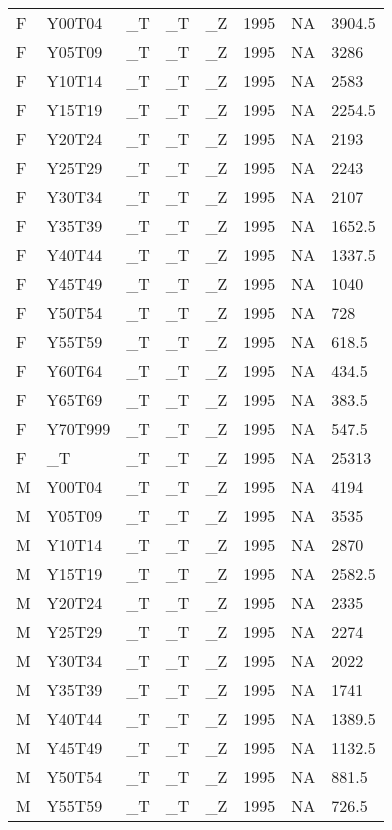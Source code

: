 \begin{longtable}[t]{llllllll}
F & Y00T04 & \_T & \_T & \_Z & 1995 & NA & 3904.5\\
F & Y05T09 & \_T & \_T & \_Z & 1995 & NA & 3286\\
\addlinespace
F & Y10T14 & \_T & \_T & \_Z & 1995 & NA & 2583\\
F & Y15T19 & \_T & \_T & \_Z & 1995 & NA & 2254.5\\
F & Y20T24 & \_T & \_T & \_Z & 1995 & NA & 2193\\
F & Y25T29 & \_T & \_T & \_Z & 1995 & NA & 2243\\
F & Y30T34 & \_T & \_T & \_Z & 1995 & NA & 2107\\
\addlinespace
F & Y35T39 & \_T & \_T & \_Z & 1995 & NA & 1652.5\\
F & Y40T44 & \_T & \_T & \_Z & 1995 & NA & 1337.5\\
F & Y45T49 & \_T & \_T & \_Z & 1995 & NA & 1040\\
F & Y50T54 & \_T & \_T & \_Z & 1995 & NA & 728\\
F & Y55T59 & \_T & \_T & \_Z & 1995 & NA & 618.5\\
\addlinespace
F & Y60T64 & \_T & \_T & \_Z & 1995 & NA & 434.5\\
F & Y65T69 & \_T & \_T & \_Z & 1995 & NA & 383.5\\
F & Y70T999 & \_T & \_T & \_Z & 1995 & NA & 547.5\\
F & \_T & \_T & \_T & \_Z & 1995 & NA & 25313\\
M & Y00T04 & \_T & \_T & \_Z & 1995 & NA & 4194\\
\addlinespace
M & Y05T09 & \_T & \_T & \_Z & 1995 & NA & 3535\\
M & Y10T14 & \_T & \_T & \_Z & 1995 & NA & 2870\\
M & Y15T19 & \_T & \_T & \_Z & 1995 & NA & 2582.5\\
M & Y20T24 & \_T & \_T & \_Z & 1995 & NA & 2335\\
M & Y25T29 & \_T & \_T & \_Z & 1995 & NA & 2274\\
\addlinespace
M & Y30T34 & \_T & \_T & \_Z & 1995 & NA & 2022\\
M & Y35T39 & \_T & \_T & \_Z & 1995 & NA & 1741\\
M & Y40T44 & \_T & \_T & \_Z & 1995 & NA & 1389.5\\
M & Y45T49 & \_T & \_T & \_Z & 1995 & NA & 1132.5\\
M & Y50T54 & \_T & \_T & \_Z & 1995 & NA & 881.5\\
\addlinespace
M & Y55T59 & \_T & \_T & \_Z & 1995 & NA & 726.5\\

\end{longtable}
